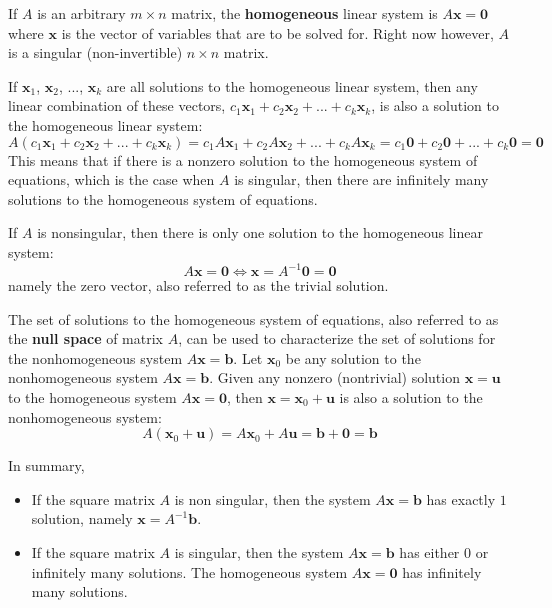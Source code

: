 \documentclass{article}
\begin{document}
If \(A\) is an arbitrary \(m \times n\) matrix, the {\bf homogeneous}  linear system is \(A\mathbf{x} = \mathbf{0}\) where \(\mathbf{x}\) is the vector of variables that are to be solved for. Right now however, \(A\) is a singular (non-invertible) \(n \times n\) matrix.  

If \(\mathbf{x}_1\), \(\mathbf{x}_2\), ..., \(\mathbf{x}_k\) are all solutions to the homogeneous linear system, then any linear combination of these vectors, \(c_1\mathbf{x}_1 + c_2\mathbf{x}_2 + ... + c_k\mathbf{x}_k\), is also a solution to the homogeneous linear system:
\[A(c_1\mathbf{x}_1 + c_2\mathbf{x}_2 + ... + c_k\mathbf{x}_k) = c_1 A\mathbf{x}_1 + c_2 A\mathbf{x}_2 + ... + c_k A\mathbf{x}_k = c_1 \mathbf{0} + c_2 \mathbf{0} + ... + c_k \mathbf{0} = \mathbf{0}\]
This means that if there is a nonzero solution to the homogeneous system of equations, which is the case when \(A\) is singular, then there are infinitely many solutions to the homogeneous system of equations. 

If \(A\) is nonsingular, then there is only one solution to the homogeneous linear system:
\[A\mathbf{x} = \mathbf{0} \iff \mathbf{x} = A^{-1}\mathbf{0} = \mathbf{0}\]
namely the zero vector, also referred to as the trivial solution.

The set of solutions to the homogeneous system of equations, also referred to as the {\bf null space} of matrix \(A\), can be used to characterize the set of solutions for the nonhomogeneous system \(A\mathbf{x} = \mathbf{b}\). Let \(\mathbf{x}_0\) be any solution to the nonhomogeneous system \(A\mathbf{x} = \mathbf{b}\). Given any nonzero (nontrivial) solution \(\mathbf{x} = \mathbf{u}\) to the homogeneous system \(A\mathbf{x} = \mathbf{0}\), then \(\mathbf{x} = \mathbf{x}_0 + \mathbf{u}\) is also a solution to the nonhomogeneous system:
\[A(\mathbf{x}_0 + \mathbf{u}) = A\mathbf{x}_0 + A\mathbf{u} = \mathbf{b} + \mathbf{0} = \mathbf{b}\]  

In summary, 
\begin{itemize}
\item If the square matrix \(A\) is non singular, then the system \(A\mathbf{x} = \mathbf{b}\) has exactly \(1\) solution, namely \(\mathbf{x} = A^{-1} \mathbf{b}\).
\item If the square matrix \(A\) is singular, then the system \(A\mathbf{x} = \mathbf{b}\) has either \(0\) or infinitely many solutions. The homogeneous system \(A\mathbf{x} = \mathbf{0}\) has  infinitely many solutions. 
\end{itemize}
\end{document}
